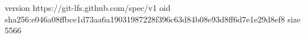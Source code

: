 version https://git-lfs.github.com/spec/v1
oid sha256:e046a08ffbce1d73aa6a19031987228f396c63d84b08e93d8ff6d7e1e29d8ef8
size 5566
